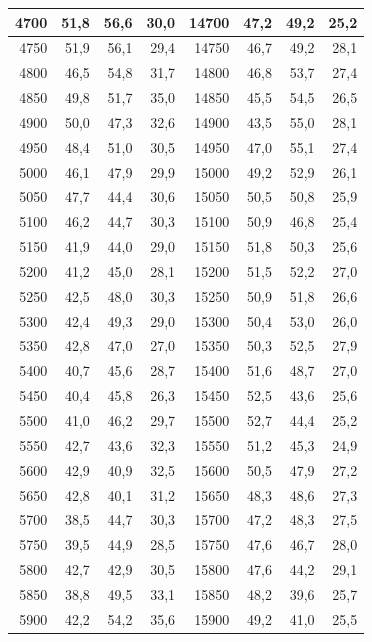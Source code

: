 \begin{small}
\begin{longtable}{|r|r|r|r|r|r|r|r|}
4700 & 51,8 & 56,6 & 30,0 & 14700 & 47,2 & 49,2 & 25,2 \\ \hline
4750 & 51,9 & 56,1 & 29,4 & 14750 & 46,7 & 49,2 & 28,1 \\ \hline
4800 & 46,5 & 54,8 & 31,7 & 14800 & 46,8 & 53,7 & 27,4 \\ \hline
4850 & 49,8 & 51,7 & 35,0 & 14850 & 45,5 & 54,5 & 26,5 \\ \hline
4900 & 50,0 & 47,3 & 32,6 & 14900 & 43,5 & 55,0 & 28,1 \\ \hline
4950 & 48,4 & 51,0 & 30,5 & 14950 & 47,0 & 55,1 & 27,4 \\ \hline
5000 & 46,1 & 47,9 & 29,9 & 15000 & 49,2 & 52,9 & 26,1 \\ \hline
5050 & 47,7 & 44,4 & 30,6 & 15050 & 50,5 & 50,8 & 25,9 \\ \hline
5100 & 46,2 & 44,7 & 30,3 & 15100 & 50,9 & 46,8 & 25,4 \\ \hline
5150 & 41,9 & 44,0 & 29,0 & 15150 & 51,8 & 50,3 & 25,6 \\ \hline
5200 & 41,2 & 45,0 & 28,1 & 15200 & 51,5 & 52,2 & 27,0 \\ \hline
5250 & 42,5 & 48,0 & 30,3 & 15250 & 50,9 & 51,8 & 26,6 \\ \hline
5300 & 42,4 & 49,3 & 29,0 & 15300 & 50,4 & 53,0 & 26,0 \\ \hline
5350 & 42,8 & 47,0 & 27,0 & 15350 & 50,3 & 52,5 & 27,9 \\ \hline
5400 & 40,7 & 45,6 & 28,7 & 15400 & 51,6 & 48,7 & 27,0 \\ \hline
5450 & 40,4 & 45,8 & 26,3 & 15450 & 52,5 & 43,6 & 25,6 \\ \hline
5500 & 41,0 & 46,2 & 29,7 & 15500 & 52,7 & 44,4 & 25,2 \\ \hline
5550 & 42,7 & 43,6 & 32,3 & 15550 & 51,2 & 45,3 & 24,9 \\ \hline
5600 & 42,9 & 40,9 & 32,5 & 15600 & 50,5 & 47,9 & 27,2 \\ \hline
5650 & 42,8 & 40,1 & 31,2 & 15650 & 48,3 & 48,6 & 27,3 \\ \hline
5700 & 38,5 & 44,7 & 30,3 & 15700 & 47,2 & 48,3 & 27,5 \\ \hline
5750 & 39,5 & 44,9 & 28,5 & 15750 & 47,6 & 46,7 & 28,0 \\ \hline
5800 & 42,7 & 42,9 & 30,5 & 15800 & 47,6 & 44,2 & 29,1 \\ \hline
5850 & 38,8 & 49,5 & 33,1 & 15850 & 48,2 & 39,6 & 25,7 \\ \hline
5900 & 42,2 & 54,2 & 35,6 & 15900 & 49,2 & 41,0 & 25,5 \\ \hline

\end{longtable}
\end{small}
